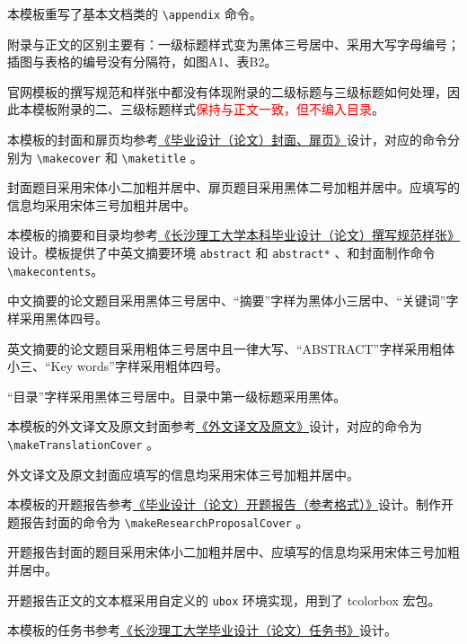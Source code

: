 本模板重写了基本文档类的 \verb!\appendix! 命令。

附录与正文的区别主要有：一级标题样式变为黑体三号居中、采用大写字母编号；插图与表格的编号没有分隔符，如图A1、表B2。

官网模板的撰写规范和样张中都没有体现附录的二级标题与三级标题如何处理，因此本模板附录的二、三级标题样式\textcolor{red}{保持与正文一致，但不编入目录}。

本模板的封面和扉页均参考\href{https://www.csust.edu.cn/jwc/info/1142/3596.htm}{《毕业设计（论文）封面、扉页》}设计，对应的命令分别为 \verb!\makecover! 和 \verb!\maketitle! 。

封面题目采用宋体小二加粗并居中、扉页题目采用黑体二号加粗并居中。应填写的信息均采用宋体三号加粗并居中。

本模板的摘要和目录均参考\href{https://www.csust.edu.cn/jwc/info/1142/3595.htm}{《长沙理工大学本科毕业设计（论文）撰写规范样张》}设计。模板提供了中英文摘要环境 \verb!abstract! 和 \verb!abstract*! 、和封面制作命令 \verb!\makecontents!。

中文摘要的论文题目采用黑体三号居中、“摘要”字样为黑体小三居中、“关键词”字样采用黑体四号。

英文摘要的论文题目采用粗体三号居中且一律大写、“ABSTRACT”字样采用粗体小三、“Key words”字样采用粗体四号。

“目录”字样采用黑体三号居中。目录中第一级标题采用黑体。


本模板的外文译文及原文封面参考\href{https://www.csust.edu.cn/jwc/info/1142/3598.htm}{《外文译文及原文》}设计，对应的命令为\\ \verb!\makeTranslationCover! 。

外文译文及原文封面应填写的信息均采用宋体三号加粗并居中。

本模板的开题报告参考\href{https://www.csust.edu.cn/jwc/info/1142/3599.htm}{《毕业设计（论文）开题报告（参考格式）》}设计。制作开题报告封面的命令为 \verb!\makeResearchProposalCover! 。

开题报告封面的题目采用宋体小二加粗并居中、应填写的信息均采用宋体三号加粗并居中。

开题报告正文的文本框采用自定义的 \verb!ubox! 环境实现，用到了 tcolorbox 宏包。


本模板的任务书参考\href{https://www.csust.edu.cn/jwc/info/1142/3600.htm}{《长沙理工大学毕业设计（论文）任务书》}设计。

